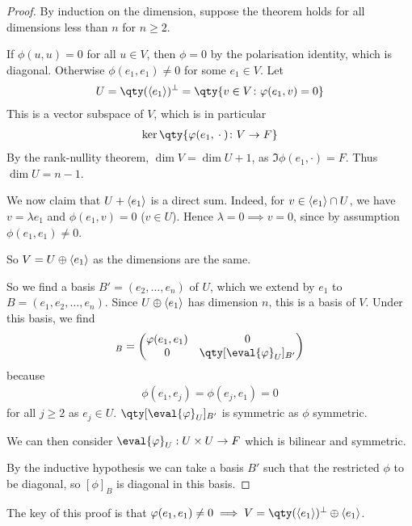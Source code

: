 \begin{proof}
	By induction on the dimension, suppose the theorem holds for all dimensions less than $n$ for $n \geq 2$.

	If $\phi(u,u) = 0$ for all $u \in V$, then $\phi = 0$ by the polarisation identity, which is diagonal.
	Otherwise $\phi(e_1, e_1) \neq 0$ for some $e_1 \in V$.
	Let
	\begin{align*}
		U = \qty(\genset{e_1})^\perp = \qty{v \in V \colon \phi(e_1, v) = 0}
	\end{align*}
	This is a vector subspace of $V$, which is in particular
	\begin{align*}
		\ker \qty{ \phi(e_1, {}\cdot{}) \colon V \to F }
	\end{align*}
	By the rank-nullity theorem, $\dim V = \dim U + 1$, as $\Im \phi(e_1, \cdot) = F$.
	Thus $\dim U = n - 1$.

	We now claim that $U + \langle{} e_1 \rangle$ is a direct sum.
	Indeed, for $v \in \langle{} e_1 \rangle \cap U$, we have $v = \lambda e_1$ and $\phi(e_1, v) = 0$ ($v \in U$).
	Hence $\lambda = 0 \implies v = 0$, since by assumption $\phi(e_1, e_1) \neq 0$.

	So $V = U \oplus \langle{} e_1 \rangle$ as the dimensions are the same.

	So we find a basis $B' = (e_2, \dots, e_n)$ of $U$, which we extend by $e_1$ to $B = (e_1, e_2, \dots, e_n)$.
	Since $U \oplus \langle{} e_1 \rangle$ has dimension $n$, this is a basis of $V$.
	Under this basis, we find
	\begin{align*}
		[\phi]_B = \begin{pmatrix}
			\phi(e_1, e_1) & 0                          \\
			0              & \qty[\eval{\phi}_{U}]_{B'}
		\end{pmatrix}
	\end{align*}
	because
	\begin{align*}
		\phi(e_1, e_j) = \phi(e_j, e_1) = 0
	\end{align*}
	for all $j \geq 2$ as $e_j \in U$.
	$\qty[\eval{\phi}_{U}]_{B'}$ is symmetric as $\phi$ symmetric.

	We can then consider $\eval{\phi}_{U} : U \times U \to F$ which is bilinear and symmetric.

	By the inductive hypothesis we can take a basis $B'$ such that the restricted $\phi$ to be diagonal, so $[\phi]_B$ is diagonal in this basis.
\end{proof}

\begin{remark}
	The key of this proof is that $\phi(e_1, e_1) \neq 0 \implies V = \qty(\genset{e_1})^\perp \oplus \genset{e_1}$.
\end{remark} 

